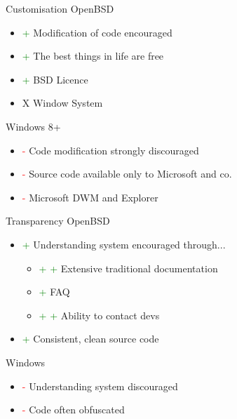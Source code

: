 \documentclass{beamer}
\newcommand{\good}{\textcolor{green}{+ }}
\newcommand{\bad}{\textcolor{red}{- }}
\begin{document}
			\begin{frame}{Customisation}
				OpenBSD
				\begin{itemize}
					\item \good Modification of code encouraged
					\item \good The best things in life are free
					\item \good BSD Licence
					\item X Window System
				\end{itemize}
				Windows 8+
				\begin{itemize}
					\item \bad Code modification strongly discouraged
					\item \bad Source code available only to Microsoft and co.
					\item \bad Microsoft DWM and Explorer
				\end{itemize}
			\end{frame}
			\begin{frame}{Transparency}
				OpenBSD
				\begin{itemize}
					\item \good Understanding system encouraged through...
					\begin{itemize}
						\item \good \good Extensive traditional documentation
						\item \good FAQ
						\item \good \good Ability to contact devs
					\end{itemize}
					\item \good Consistent, clean source code
				\end{itemize}
				Windows
				\begin{itemize}
					\item \bad Understanding system discouraged
					\item \bad Code often obfuscated
				\end{itemize}
			\end{frame}
\end{document}
